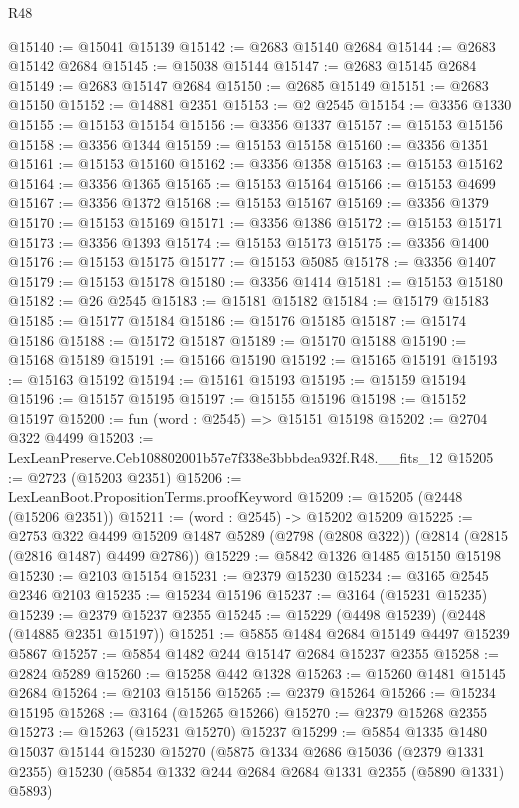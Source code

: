 \begin{lexlean}{R48}
\begin{coremodule}
@15140 := @15041 @15139
@15142 := @2683 @15140 @2684
@15144 := @2683 @15142 @2684
@15145 := @15038 @15144
@15147 := @2683 @15145 @2684
@15149 := @2683 @15147 @2684
@15150 := @2685 @15149
@15151 := @2683 @15150
@15152 := @14881 @2351
@15153 := @2 @2545
@15154 := @3356 @1330
@15155 := @15153 @15154
@15156 := @3356 @1337
@15157 := @15153 @15156
@15158 := @3356 @1344
@15159 := @15153 @15158
@15160 := @3356 @1351
@15161 := @15153 @15160
@15162 := @3356 @1358
@15163 := @15153 @15162
@15164 := @3356 @1365
@15165 := @15153 @15164
@15166 := @15153 @4699
@15167 := @3356 @1372
@15168 := @15153 @15167
@15169 := @3356 @1379
@15170 := @15153 @15169
@15171 := @3356 @1386
@15172 := @15153 @15171
@15173 := @3356 @1393
@15174 := @15153 @15173
@15175 := @3356 @1400
@15176 := @15153 @15175
@15177 := @15153 @5085
@15178 := @3356 @1407
@15179 := @15153 @15178
@15180 := @3356 @1414
@15181 := @15153 @15180
@15182 := @26 @2545
@15183 := @15181 @15182
@15184 := @15179 @15183
@15185 := @15177 @15184
@15186 := @15176 @15185
@15187 := @15174 @15186
@15188 := @15172 @15187
@15189 := @15170 @15188
@15190 := @15168 @15189
@15191 := @15166 @15190
@15192 := @15165 @15191
@15193 := @15163 @15192
@15194 := @15161 @15193
@15195 := @15159 @15194
@15196 := @15157 @15195
@15197 := @15155 @15196
@15198 := @15152 @15197
@15200 := fun (word : @2545) => @15151 @15198
@15202 := @2704 @322 @4499
@15203 := LexLeanPreserve.Ceb108802001b57e7f338e3bbbdea932f.R48.__fits_12
@15205 := @2723 (@15203 @2351)
@15206 := LexLeanBoot.PropositionTerms.proofKeyword
@15209 := @15205 (@2448 (@15206 @2351))
@15211 := (word : @2545) -> @15202 @15209
@15225 := @2753
    @322
    @4499
    @15209
    @1487
    @5289
    (@2798 (@2808 @322))
    (@2814 (@2815 (@2816 @1487) @4499 @2786))
@15229 := @5842 @1326 @1485 @15150 @15198
@15230 := @2103 @15154
@15231 := @2379 @15230
@15234 := @3165 @2545 @2346 @2103
@15235 := @15234 @15196
@15237 := @3164 (@15231 @15235)
@15239 := @2379 @15237 @2355
@15245 := @15229 (@4498 @15239) (@2448 (@14885 @2351 @15197))
@15251 := @5855 @1484 @2684 @15149 @4497 @15239 @5867
@15257 := @5854 @1482 @244 @15147 @2684 @15237 @2355
@15258 := @2824 @5289
@15260 := @15258 @442 @1328
@15263 := @15260 @1481 @15145 @2684
@15264 := @2103 @15156
@15265 := @2379 @15264
@15266 := @15234 @15195
@15268 := @3164 (@15265 @15266)
@15270 := @2379 @15268 @2355
@15273 := @15263 (@15231 @15270) @15237
@15299 := @5854
    @1335
    @1480
    @15037
    @15144
    @15230
    @15270
    (@5875
      @1334
      @2686
      @15036
      (@2379 @1331 @2355)
      @15230
      (@5854 @1332 @244 @2684 @2684 @1331 @2355 (@5890 @1331) @5893)

\end{coremodule}
\end{lexlean}
